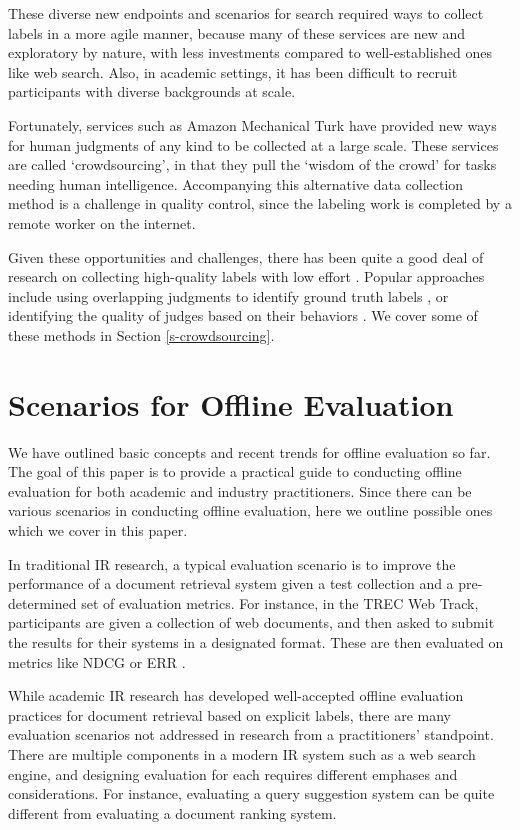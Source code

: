 These diverse new endpoints and scenarios for search required ways to collect labels in a more agile manner, because many of these services are new and exploratory by nature, with less investments compared to well-established ones like web search. Also, in academic settings, it has been difficult to recruit participants with diverse backgrounds at scale.

Fortunately, services such as Amazon Mechanical Turk have provided new ways for human judgments of any kind to be collected at a large scale. These services are called `crowdsourcing', in that they pull the `wisdom of the crowd' for tasks needing human intelligence. Accompanying this alternative data collection method is a challenge in quality control, since the labeling work is completed by a remote worker on the internet.

Given these opportunities and challenges, there has been quite a good deal of research on collecting high-quality labels with low effort \citep{Alonso2012}. Popular approaches include using overlapping judgments to identify ground truth labels \citep{Venanzi:2014}, or identifying the quality of judges based on their behaviors \citep{Kazai:2016}. We cover some of these methods in Section \ref{s-crowdsourcing}.


\section{Scenarios for Offline Evaluation}

We have outlined basic concepts and recent trends for offline evaluation so far. The goal of this paper is to provide a practical guide to conducting offline evaluation for both academic and industry practitioners. Since there can be various scenarios in conducting offline evaluation, here we outline possible ones which we cover in this paper.

In traditional IR research, a typical evaluation scenario is to improve the performance of a document retrieval system given a test collection and a pre-determined set of evaluation metrics. For instance, in the TREC Web Track, participants are given a collection of web documents, and then asked to submit the results for their systems in a designated format. These are then evaluated on metrics like NDCG \citep{Jarvelin:2002} or ERR \citep{ChapelleMZG09}.

While academic IR research has developed well-accepted offline evaluation practices for document retrieval based on explicit labels, there are many evaluation scenarios not addressed in research from a practitioners' standpoint. There are multiple components in a modern IR system such as a web search engine, and designing evaluation for each requires different emphases and considerations. For instance, evaluating a query suggestion system can be quite different from evaluating a document ranking system. %

